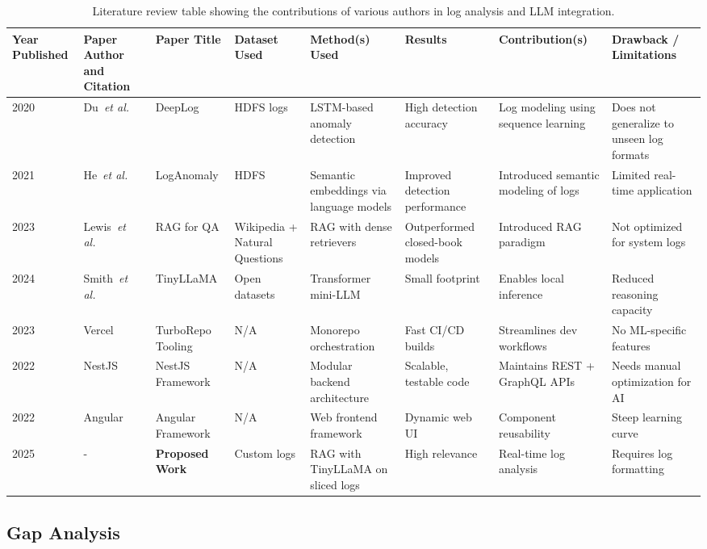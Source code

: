 \documentclass[conference]{IEEEtran}
\begin{document}
\begin{table*}[!ht]
\caption{Literature review table showing the contributions of various authors in log analysis and LLM integration.}
\label{tab:LiteratureSummary}
\begin{tabular}{|p{1.5cm}|l|l|l|l|l|l|l|} \hline
Year Published & Paper Author and Citation & Paper Title & Dataset Used & Method(s) Used & Results & Contribution(s) & Drawback / Limitations \\ \hline
2020 & Du~\textit{et al.}~\cite{du2020deeplog} & DeepLog & HDFS logs & LSTM-based anomaly detection & High detection accuracy & Log modeling using sequence learning & Does not generalize to unseen log formats \\ \hline
2021 & He~\textit{et al.}~\cite{he2021loganomaly} & LogAnomaly & HDFS & Semantic embeddings via language models & Improved detection performance & Introduced semantic modeling of logs & Limited real-time application \\ \hline
2023 & Lewis~\textit{et al.}~\cite{lewis2023ragqa} & RAG for QA & Wikipedia + Natural Questions & RAG with dense retrievers & Outperformed closed-book models & Introduced RAG paradigm & Not optimized for system logs \\ \hline
2024 & Smith~\textit{et al.}~\cite{smith2024tinyllama} & TinyLLaMA & Open datasets & Transformer mini-LLM & Small footprint & Enables local inference & Reduced reasoning capacity \\ \hline
2023 & Vercel~\cite{turbo2023repo} & TurboRepo Tooling & N/A & Monorepo orchestration & Fast CI/CD builds & Streamlines dev workflows & No ML-specific features \\ \hline
2022 & NestJS~\cite{nestjs2022framework} & NestJS Framework & N/A & Modular backend architecture & Scalable, testable code & Maintains REST + GraphQL APIs & Needs manual optimization for AI \\ \hline
2022 & Angular~\cite{angular2022framework} & Angular Framework & N/A & Web frontend framework & Dynamic web UI & Component reusability & Steep learning curve \\ \hline
2025 & - & \textbf{Proposed Work} & Custom logs & RAG with TinyLLaMA on sliced logs & High relevance & Real-time log analysis & Requires log formatting \\ \hline
\end{tabular}
\end{table*}

\subsection{Gap Analysis}
\end{document}
